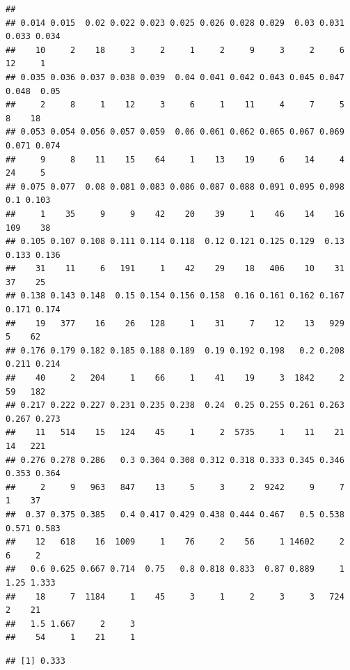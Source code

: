 \documentclass[
]{article}
\newenvironment{Shaded}{\begin{snugshade}}{\end{snugshade}}
\newcommand{\FunctionTok}[1]{\textcolor[rgb]{0.00,0.00,0.00}{#1}}
\newcommand{\NormalTok}[1]{#1}
\newcommand{\SpecialCharTok}[1]{\textcolor[rgb]{0.00,0.00,0.00}{#1}}
\begin{document}
\begin{verbatim}
## 
## 0.014 0.015  0.02 0.022 0.023 0.025 0.026 0.028 0.029  0.03 0.031 0.033 0.034 
##    10     2    18     3     2     1     2     9     3     2     6    12     1 
## 0.035 0.036 0.037 0.038 0.039  0.04 0.041 0.042 0.043 0.045 0.047 0.048  0.05 
##     2     8     1    12     3     6     1    11     4     7     5     8    18 
## 0.053 0.054 0.056 0.057 0.059  0.06 0.061 0.062 0.065 0.067 0.069 0.071 0.074 
##     9     8    11    15    64     1    13    19     6    14     4    24     5 
## 0.075 0.077  0.08 0.081 0.083 0.086 0.087 0.088 0.091 0.095 0.098   0.1 0.103 
##     1    35     9     9    42    20    39     1    46    14    16   109    38 
## 0.105 0.107 0.108 0.111 0.114 0.118  0.12 0.121 0.125 0.129  0.13 0.133 0.136 
##    31    11     6   191     1    42    29    18   406    10    31    37    25 
## 0.138 0.143 0.148  0.15 0.154 0.156 0.158  0.16 0.161 0.162 0.167 0.171 0.174 
##    19   377    16    26   128     1    31     7    12    13   929     5    62 
## 0.176 0.179 0.182 0.185 0.188 0.189  0.19 0.192 0.198   0.2 0.208 0.211 0.214 
##    40     2   204     1    66     1    41    19     3  1842     2    59   182 
## 0.217 0.222 0.227 0.231 0.235 0.238  0.24  0.25 0.255 0.261 0.263 0.267 0.273 
##    11   514    15   124    45     1     2  5735     1    11    21    14   221 
## 0.276 0.278 0.286   0.3 0.304 0.308 0.312 0.318 0.333 0.345 0.346 0.353 0.364 
##     2     9   963   847    13     5     3     2  9242     9     7     1    37 
##  0.37 0.375 0.385   0.4 0.417 0.429 0.438 0.444 0.467   0.5 0.538 0.571 0.583 
##    12   618    16  1009     1    76     2    56     1 14602     2     6     2 
##   0.6 0.625 0.667 0.714  0.75   0.8 0.818 0.833  0.87 0.889     1  1.25 1.333 
##    18     7  1184     1    45     3     1     2     3     3   724     2    21 
##   1.5 1.667     2     3 
##    54     1    21     1
\end{verbatim}

\begin{Shaded}
\end{Shaded}

\begin{verbatim}
## [1] 0.333
\end{verbatim}

\begin{Shaded}
\end{Shaded}
\end{document}
